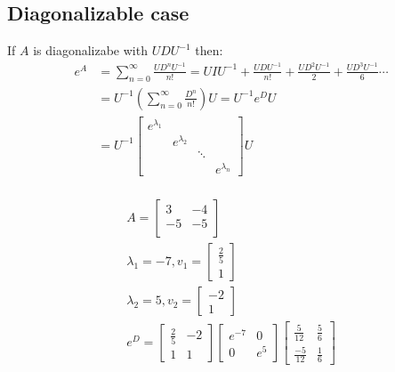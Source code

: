 \subsection{Diagonalizable case}
If \(A\) is diagonalizabe with \(UDU^{-1}\) then:
\begin{align*}
    e^{A} & = \sum_{n=0}^{\infty} \frac{U D^n U^{-1}}{n!} = U I U^{-1} + \frac{U D U^{-1}}{n!}  + \frac{{U D^2 U^{-1}}}{2} + \frac{U D^3 U^{-1}}{6} \cdots \\
          & = U^{-1} \left(\sum_{n=0}^{\infty} \frac{D^n}{n!}\right)U = U^{-1}e^DU                                                                         \\
          & = U^{-1} \begin{bmatrix}
        e^{\lambda_1} &                &        &               \\
                      & e^{\lambda_2 } &        &               \\
                      &                & \ddots &               \\
                      &                &        & e^{\lambda_n}
    \end{bmatrix} U                                                                                                         \\
\end{align*}
\begin{example}
    \begin{gather*}
        A = \begin{bmatrix}
            3 & -4 \\ -5 & -5 \\
        \end{bmatrix} \\
        \lambda_1 = -7, v_1 = \begin{bmatrix}
            \frac{2}{5} \\ 1
        \end{bmatrix} \\
        \lambda_2 = 5, v_2 = \begin{bmatrix}
            -2 \\ 1
        \end{bmatrix} \\
        e^D =         \begin{bmatrix}
            \frac{2}{5} & -2 \\ 1 & 1
        \end{bmatrix}
        \begin{bmatrix}
            e^{-7} & 0 \\0 & e^5
        \end{bmatrix}
        \begin{bmatrix} \frac{5}{12} & \frac{5}{6} \\ \frac{-5}{12} & \frac{1}{6} \end{bmatrix}
    \end{gather*}
\end{example}
